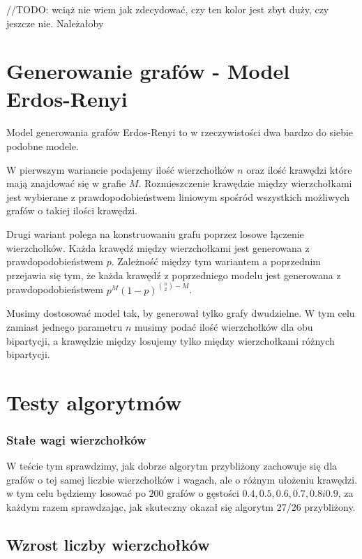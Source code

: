\documentclass{article}
\begin{document}
//TODO: wciąż nie wiem jak zdecydować, czy ten kolor jest zbyt duży, czy jeszcze nie. Należałoby 

\section{Generowanie grafów - Model Erdos-Renyi}

\paragraph{} Model generowania grafów Erdos-Renyi to w rzeczywistości dwa bardzo do siebie podobne modele. 

W pierwszym wariancie podajemy ilość wierzchołków $n$ oraz ilość krawędzi które mają znajdować się w grafie $M$. Rozmieszczenie krawędzie między wierzchołkami jest wybierane z prawdopodobieństwem liniowym spośród wszystkich możliwych grafów o takiej ilości krawędzi.

Drugi wariant polega na konstruowaniu grafu poprzez losowe łączenie wierzchołków. Każda krawędź między wierzchołkami jest generowana z prawdopodobieństwem $p$. Zależność między tym wariantem a poprzednim przejawia się tym, że każda krawędź z poprzedniego modelu jest generowana z prawdopodobieństwem $p^M(1-p)^{{n \choose 2}-M}$.

Musimy dostosować model tak, by generował tylko grafy dwudzielne. W tym celu zamiast jednego parametru $n$ musimy podać ilość wierzchołków dla obu bipartycji, a krawędzie między losujemy tylko między wierzchołkami różnych bipartycji.

\section{Testy algorytmów}

\subsubsection{Stałe wagi wierzchołków}

W teście tym sprawdzimy, jak dobrze algorytm przybliżony zachowuje się dla grafów o tej samej liczbie wierzchołków i wagach, ale o różnym ułożeniu krawędzi. w tym celu będziemy losować po $200$ grafów o gęstości $0.4, 0.5, 0.6, 0.7, 0.8 i 0.9$, za każdym razem sprawdzając, jak skuteczny okazał się algorytm 27/26 przybliżony.

\subsection*{Wzrost liczby wierzchołków}
\end{document}
